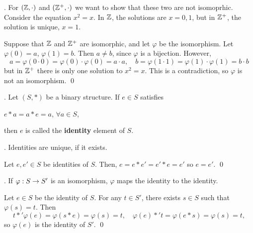 \ex. For \((\mathbb{Z}, \cdot)\) and \((\mathbb{Z}^+, \cdot)\) we want to show that these two are not isomoprhic. Consider the equation \(x^2 = x\). In \(\mathbb{Z}\), the solutions are \(x = 0, 1\), but in \(\mathbb{Z}^+\), the solution is unique, \(x = 1\).

\pf Suppose that \(\mathbb{Z}\) and \(\mathbb{Z}^+\) are isomorphic, and let \(\varphi\) be the isomorphism. Let \(\varphi(0) = a\), \(\varphi(1) = b\). Then \(a \neq b\), since \(\varphi\) is a bijection. However,
\[
    a = \varphi(0 \cdot 0) = \varphi(0) \cdot \varphi(0) = a \cdot a, \quad
    b = \varphi(1 \cdot 1) = \varphi(1) \cdot \varphi(1) = b \cdot b
\]
but in \(\mathbb{Z}^+\) there is only one solution to \(x^2 = x\). This is a contradiction, so \(\varphi\) is not an isomorphism. \qed

.  Let \((S, *)\) be a binary structure. If \(e \in S\) satisfies
\begin{center}
    \(e * a = a * e = a\), \quad \(\forall a \in S\),
\end{center}
then \(e\) is called the \textbf{identity} element of \(S\).

\thm. Identities are unique, if it exists.

\pf Let \(e, e' \in S\) be identities of \(S\). Then, \(e = e * e' = e' * e = e'\) so \(e = e'\). \qed

\thm. If \(\varphi: S \rightarrow S'\) is an isomorphism, \(\varphi\) maps the identity to the identity.

\pf Let \(e \in S\) be the identity of \(S\). For any \(t \in S'\), there exists \(s \in S\) such that \(\varphi(s) = t\). Then
\[
    t *' \varphi(e) = \varphi(s * e) = \varphi(s) = t, \quad
    \varphi(e) *' t = \varphi(e * s) = \varphi(s) = t,
\]
so \(\varphi(e)\) is the identity of \(S'\). \qed

\pagebreak
